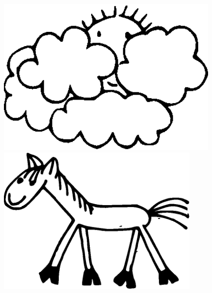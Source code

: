 \documentclass[11pt,a4paper,twoside]{article}
\begin{document}
\vfil
\pagebreak
\vfil
\hspace*{2cm}\includegraphics[width=11cm]{17.eps}
\vfil
\pagebreak
\pagebreak
\vfil
\hspace*{2cm}\includegraphics[width=10cm]{18.eps}
\vfil
\pagebreak
\pagebreak
\pagebreak
\pagebreak
\pagebreak
\end{document}
